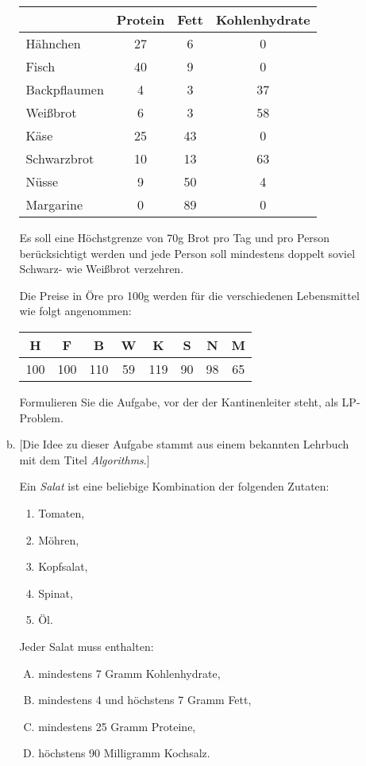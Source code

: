 \documentclass[10pt, a4paper]{article}
\begin{document}
\begin{enumerate}[\bfseries A:]
\begin{enumerate}[\bfseries 1.]
\begin{enumerate}[a)]
\begin{center}
\begin{tabular}{l|c|c|c}
 & Protein & Fett & Kohlenhydrate \\ \hline
Hähnchen     & 27 &  6 &  0 \\
Fisch        & 40 &  9 &  0 \\
Backpflaumen &  4 &  3 & 37 \\
Weißbrot     &  6 &  3 & 58 \\
Käse         & 25 & 43 &  0 \\
Schwarzbrot  & 10 & 13 & 63 \\
Nüsse        &  9 & 50 &  4 \\
Margarine    &  0 & 89 &  0
\end{tabular}
\end{center}

Es soll eine Höchstgrenze von 70g Brot pro Tag und pro Person berücksichtigt werden und jede Person soll mindestens doppelt soviel Schwarz- wie Weißbrot verzehren.

\pagebreak
Die Preise in Öre pro 100g werden für die verschiedenen Lebensmittel wie folgt angenommen:

\begin{center}
\begin{tabular}{c|c|c|c|c|c|c|c}
H & F & B & W & K & S & N & M \\ \hline
100 & 100 & 110 & 59 & 119 & 90 & 98 & 65
\end{tabular}
\end{center}

\medskip

Formulieren Sie die Aufgabe, vor der der Kantinenleiter steht, als LP-Problem.


\item $\lbrack$Die Idee zu dieser Aufgabe stammt aus einem bekannten Lehrbuch mit dem Titel \textit{Algorithms}.$\rbrack$ 

\medskip
Ein \textit{Salat} ist eine beliebige Kombination der folgenden Zutaten: 
\begin{enumerate}[(1)]
\item Tomaten,
\item Möhren,
\item Kopfsalat,
\item Spinat,
\item Öl.
\end{enumerate}

Jeder Salat muss enthalten:
\begin{enumerate}[(A)]
\item mindestens 7 Gramm Kohlenhydrate,
\item mindestens 4 und höchstens 7 Gramm Fett,
\item mindestens 25 Gramm Proteine,
\item höchstens 90 Milligramm Kochsalz.
\end{enumerate}


\end{enumerate}
\end{enumerate}
\end{enumerate}
\end{document}
